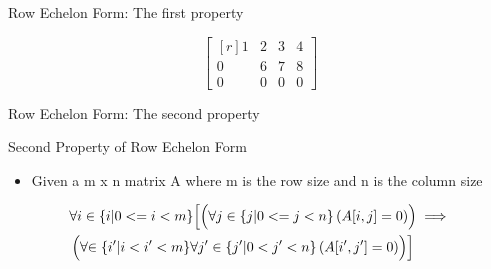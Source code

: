 \documentclass{beamer}
\begin{document}
\begin{frame}{Row Echelon Form: The first property}
  \begin{example}
    \begin{equation}
      \begin{bmatrix*}[r]
        1 & 2 & 3 & 4 \\
        0 & 6 & 7 & 8 \\
        0 & 0 & 0 & 0
      \end{bmatrix*}
    \end{equation}
  \end{example}
\end{frame}

\begin{frame}{Row Echelon Form: The second property}
  \begin{block}{Second Property of Row Echelon Form}
    \begin{itemize}
    \item Given a m x n matrix A where m is the row size and n is the column size
    \end{itemize}
    \begin{equation}
      \begin{split}
        &\forall i \in \{i | 0 <= i < m\}\Bigl[\Bigl(\forall j \in \{j | 0 <= j < n \}\left( A[i, j] = 0\right)\Bigr) \implies \Bigr. \\ 
        &\left(\forall \Bigl. \in \{i^{\prime} | i < i^{\prime} < m\} \forall j^{\prime} \in \{ j^{\prime} | 0 < j^{\prime} < n \} \left(A[i^{\prime}, j^{\prime}] = 0\right) \right) \Bigr]
      \end{split}
    \end{equation}
  \end{block}
\end{frame}
\end{document}
